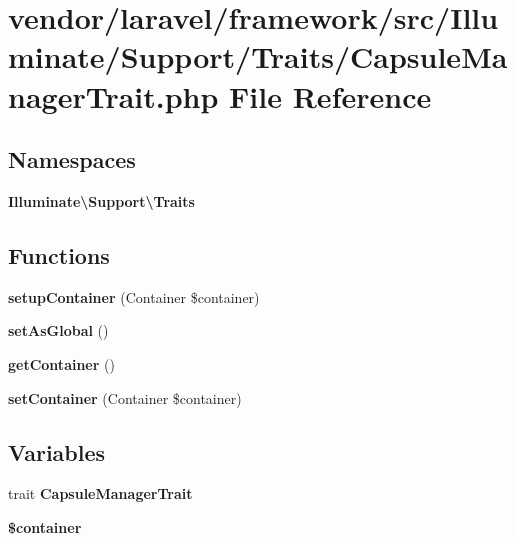 \section{vendor/laravel/framework/src/\+Illuminate/\+Support/\+Traits/\+Capsule\+Manager\+Trait.php File Reference}
\label{_capsule_manager_trait_8php}
\subsection*{Namespaces}
\begin{DoxyCompactItemize}
\item 
 {\bf Illuminate\textbackslash{}\+Support\textbackslash{}\+Traits}
\end{DoxyCompactItemize}
\subsection*{Functions}
\begin{DoxyCompactItemize}
\item 
{\bf setup\+Container} (Container \$container)
\item 
{\bf set\+As\+Global} ()
\item 
{\bf get\+Container} ()
\item 
{\bf set\+Container} (Container \$container)
\end{DoxyCompactItemize}
\subsection*{Variables}
\begin{DoxyCompactItemize}
\item 
trait {\bf Capsule\+Manager\+Trait}
\item 
{\bf \$container}
\end{DoxyCompactItemize}
